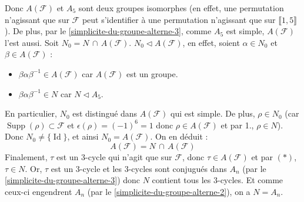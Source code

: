 \begin{demonstration}
		Donc $A(\mathcal{F})$ et $A_5$ sont deux groupes isomorphes (en effet, une permutation n'agissant que sur $\mathcal{F}$ peut s'identifier à une permutation n'agissant que sur $\llbracket 1, 5 \rrbracket$). De plus, par le \cref{simplicite-du-groupe-alterne-3}, comme $A_5$ est simple, $A(\mathcal{F})$ l'est aussi.
		\newpar
		Soit $N_0 = N \, \cap \, A(\mathcal{F})$. $N_0 \lhd A(\mathcal{F})$, en effet, soient $\alpha \in N_0$ et $\beta \in A(\mathcal{F})$ :
		\begin{itemize}
			\item $\beta \alpha \beta^{-1} \in A(\mathcal{F})$ car $A(\mathcal{F})$ est un groupe.
			\item $\beta \alpha \beta^{-1} \in N$ car $N \lhd A_5$.
		\end{itemize}
		En particulier, $N_0$ est distingué dans $A(\mathcal{F})$ qui est simple. De plus, $\rho \in N_0$ (car $\operatorname{Supp}(\rho) \subset \mathcal{F}$ et $\epsilon(\rho) = (-1)^{6} = 1$ donc $\rho \in A(\mathcal{F})$ et par 1., $\rho \in N$). Donc $N_0 \neq \{ \operatorname{Id} \}$, et ainsi $N_0 = A(\mathcal{F})$. On en déduit :
		\[ A(\mathcal{F}) = N \, \cap \, A(\mathcal{F}) \tag{$*$} \]
		Finalement, $\tau$ est un $3$-cycle qui n'agit que sur $\mathcal{F}$, donc $\tau \in A(\mathcal{F})$ et par $(*)$, $\tau \in N$. Or, $\tau$ est un $3$-cycle et les $3$-cycles sont conjugués dans $A_n$ (par le \cref{simplicite-du-groupe-alterne-3}) donc $N$ contient tous les $3$-cycles. Et comme ceux-ci engendrent $A_n$ (par le \cref{simplicite-du-groupe-alterne-2}), on a $N = A_n$.
	\end{demonstration}

